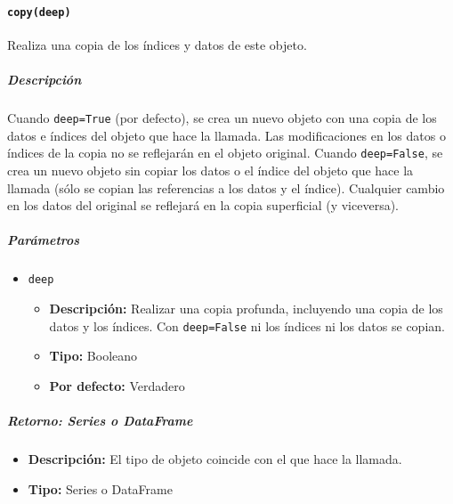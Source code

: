 \paragraph{\texttt{copy(deep)}} Realiza una copia de los índices y datos de este objeto.
\subparagraph{\textbf{Descripción}}
Cuando \texttt{deep=True} (por defecto), se crea un nuevo objeto con una copia de los datos e índices del objeto que hace la llamada. Las modificaciones en los datos o índices de la copia no se reflejarán en el objeto original.
Cuando \texttt{deep=False}, se crea un nuevo objeto sin copiar los datos o el índice del objeto que hace la llamada (sólo se copian las referencias a los datos y el índice). Cualquier cambio en los datos del original se reflejará en la copia superficial (y viceversa).
\subparagraph{\textbf{Parámetros}}
\begin{itemize}
\item \texttt{deep}
\begin{itemize}
\item \textbf{Descripción:} Realizar una copia profunda, incluyendo una copia de los datos y los índices. Con \texttt{deep=False} ni los índices ni los datos se copian.
\item \textbf{Tipo:} Booleano
\item \textbf{Por defecto:} Verdadero
\end{itemize}
\end{itemize}
\subparagraph{\textbf{Retorno:} Series o DataFrame}
\begin{itemize}
\item \textbf{Descripción:} El tipo de objeto coincide con el que hace la llamada.
\item \textbf{Tipo:} Series o DataFrame
\end{itemize}
